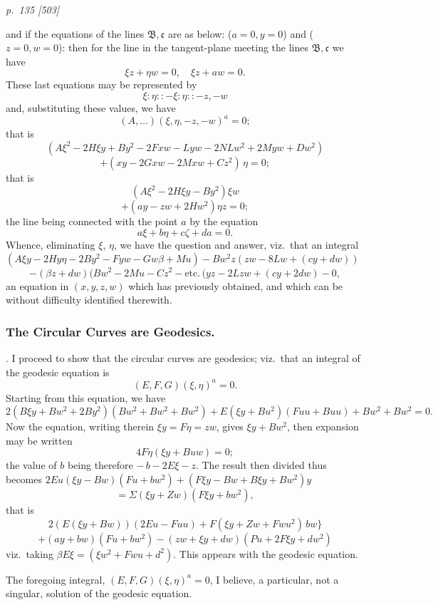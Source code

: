 \documentclass[11pt,a4paper]{book}
\begin{document}
\clearpage

\bigskip
\textit{p.~135 [503]}
\smallskip

\noindent
and if the equations of the lines $\mathfrak{B}, \mathfrak{c}$ are as below: ($a = 0, y = 0$) and ($z = 0, w = 0$):
then for the line in the tangent-plane meeting the lines $\mathfrak{B}, \mathfrak{c}$ we have
\[
\xi z + \eta w = 0, \quad \xi z + a w = 0.
\]
These last equations may be represented by
\[
\xi: \eta:: -\xi:\eta:: -z, -w
\]
and, substituting these values, we have
\[
(A, \ldots)(\xi, \eta, -z, -w)^a = 0;
\]
that is
\[
(A\xi^2 - 2H\xi y + By^2 - 2Fxw - L y w - 2NLw^2 + 2My w + Dw^2)
\]
\[
+ (xy - 2Gxw - 2Mxw + Cz^2)\,\eta = 0;
\]
that is
\[
(A\xi^2 - 2 H \xi y - B y^2)\xi w
\]
\[
+ (a y - z w + 2 H w^2)\eta z = 0;
\]
the line being connected with the point $a$ by the equation
\[
a\xi + b\eta + c\zeta + d a = 0.
\]
Whence, eliminating $\xi$, $\eta$, we have the question and answer, viz.\ that an integral
$(A\xi y - 2Hy\eta - 2By^2 - F yw - Gw\beta + Mu) - Bw^2 z(zw - 8Lw + (cy + dw))$
\[
- (\beta z + dw)(B w^2 - 2Mu - Cz^2 - \text{etc.}\,(yz - 2Lzw + (cy + 2 dw) - 0,
\]
an equation in $(x, y, z, w)$ which has previously obtained, and which can be without
difficulty identified therewith.

\subsubsection*{The Circular Curves are Geodesics.}

. I proceed to show that the circular curves are geodesics; viz.\ that an integral
of the geodesic equation is
\[
(E, F, G)(\xi, \eta)^a = 0.
\]
Starting from this equation, we have
\[
2 (B\xi y + B w^2 + 2By^2)(B w^2 + B w^2 + B w^2)+ E(\xi y + B u^2)(F u u + B u u) + B w^2 + B w^2 = 0.
\]
Now the equation, writing therein $\xi y = F\eta = z w$, gives $\xi y + B w^2$, then expansion
may be written
\[
4F\eta(\xi y + B u w) = 0;
\]
the value of $b$ being therefore $-\,b - 2E\xi - z$. The result then divided thus becomes
$2Eu(\xi y - B w)(F u + b w^2) + (F \xi y - B w + B \xi y + B w^2) y$
\[
=\Sigma(\xi y + Z w)(F\xi y + b w^2),
\]
that is
\[
2(E(\xi y + B w))(2Eu - F u u) + F(\xi y + Z w + F w u^2)\,b w\}
\]
\[
+ (a y + b w)(F u + b w^2) - (z w + \xi y + d w)(P u + 2F\xi y + d w^2)
\]
viz.\ taking $\beta E\xi = (\xi w^2 + F w u + d^2)$. This appears with the geodesic equation.

The foregoing integral, $(E, F, G)(\xi, \eta)^a = 0$, I believe, a particular, not a singular,
solution of the geodesic equation.
\end{document}
